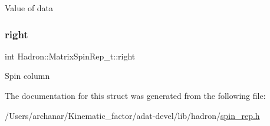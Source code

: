 Value of data \mbox{\label{structHadron_1_1MatrixSpinRep__t_a8c99524ce50d315e915216514946d5ec}} 
\subsubsection{\texorpdfstring{right}{right}}
{\footnotesize\ttfamily int Hadron\+::\+Matrix\+Spin\+Rep\+\_\+t\+::right}

Spin column 

The documentation for this struct was generated from the following file\+:\begin{DoxyCompactItemize}
\item 
/\+Users/archanar/\+Kinematic\+\_\+factor/adat-\/devel/lib/hadron/\mbox{\hyperlink{adat-devel_2lib_2hadron_2spin__rep_8h}{spin\+\_\+rep.\+h}}\end{DoxyCompactItemize}
